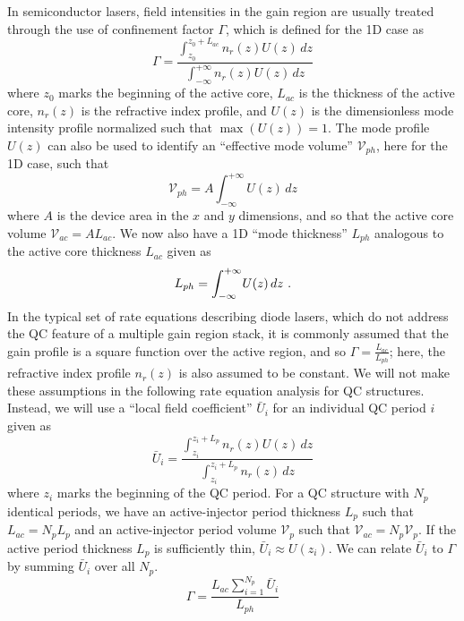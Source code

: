 {In semiconductor lasers, field intensities in the gain region are usually treated through the use of confinement factor $\Gamma$, which is defined for the 1D case as \cite{ColdrenCorzine}
\begin{equation}
\label{chpt1eqn:Gamma}
\Gamma = \frac{\int_{z_0}^{z_0+L_{ac}} \! n_r(z) U(z) \, dz}{\int_{-\infty}^{+\infty} \! n_r(z) U(z) \, dz}
\end{equation}
where $z_0$ marks the beginning of the active core, $L_{ac}$ is the thickness of the active core, $n_r(z)$ is the refractive index profile,
and $U(z)$ is the dimensionless mode intensity profile normalized such that $\max(U(z))=1$.  The mode profile $U(z)$ can also be used to identify an ``effective mode volume'' $\mathcal{V}_{ph}$, here for the 1D case, such that
\begin{equation}
\mathcal{V}_{ph} = A \int_{-\infty}^{+\infty} \! U(z) \, dz
\end{equation}
where $A$ is the device area in the $x$ and $y$ dimensions, and so that the active core volume $\mathcal{V}_{ac}=A L_{ac}$.  We now also have a 1D ``mode thickness'' $L_{ph}$ analogous to the active core thickness $L_{ac}$ given as
\begin{equation}
L_{ph} = \int_{-\infty}^{+\infty} \! U(z) \, dz \textnormal{~.}
\end{equation}
In the typical set of rate equations describing diode lasers, which do not address the QC feature of a multiple gain region stack, it is commonly assumed that the gain profile is a square function over the active region, and so $\Gamma=\frac{L_{ac}}{L_{ph}}$; here, the refractive index profile $n_r(z)$ is also assumed to be constant.  We will not make these assumptions in the following rate equation analysis for QC structures.  Instead, we will use a ``local field coefficient'' $\bar{U}_i$ for an individual QC period $i$ given as
\begin{equation}
\bar{U}_i = \frac{\int_{z_i}^{z_i+L_{p}} \! n_r(z) U(z) \, dz}{\int_{z_i}^{z_i+L_p} \! n_r(z) \, dz}
\end{equation}
where $z_i$ marks the beginning of the QC period.  For a QC structure with $N_p$ identical periods, we have an active-injector period thickness $L_p$ such that $L_{ac}=N_p L_p$ and an active-injector period volume $\mathcal{V}_p$ such that $\mathcal{V}_{ac} = N_p \mathcal{V}_{p}$.  If the active period thickness $L_p$ is sufficiently thin, $\bar{U}_i\approx U(z_i)$.  We can relate $\bar{U}_i$ to $\Gamma$ by summing $\bar{U}_i$ over all $N_p$.
\begin{equation}
\label{chpt1eqn:barGamma}
\Gamma = \frac{L_{ac} \sum_{i=1}^{N_p} \bar{U}_i}{L_{ph}}
\end{equation}

}
